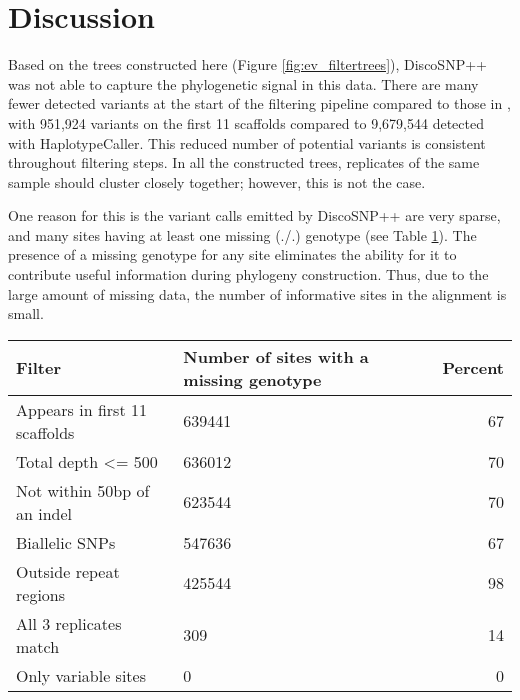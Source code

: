 \section{Discussion}

Based on the trees constructed here (Figure \ref{fig:ev_filtertrees}), DiscoSNP++ was not able to capture the phylogenetic signal in this data. There are many fewer detected variants at the start of the filtering pipeline compared to those in \textcite{orr_phylogenomic_2020}, with 951,924 variants on the first 11 scaffolds compared to 9,679,544 detected with HaplotypeCaller. This reduced number of potential variants is consistent throughout filtering steps. In all the constructed trees, replicates of the same sample should cluster closely together; however, this is not the case.

One reason for this is the variant calls emitted by DiscoSNP++ are very sparse, and many sites having at least one missing (./.) genotype (see Table \ref{tbl:ev_missing}). The presence of a missing genotype for any site eliminates the ability for it to contribute useful information during phylogeny construction. Thus, due to the large amount of missing data, the number of informative sites in the alignment is small. 

\begin{table}
\centering
\begin{tabularx}{.8\textwidth}{ l X r }
\toprule
\textbf{Filter} & \textbf{Number of sites with \newline a missing genotype} & \textbf{Percent}\\
\midrule
Appears in first 11 scaffolds & 639441 & 67\\
Total depth <= 500 & 636012 & 70\\
Not within 50bp of an indel & 623544 & 70\\
Biallelic SNPs & 547636 & 67\\
Outside repeat regions & 425544 & 98\\
All 3 replicates match & 309 & 14\\
Only variable sites & 0 & 0\\
\bottomrule
\end{tabularx}
\label{tbl:ev_missing}
\end{table}


